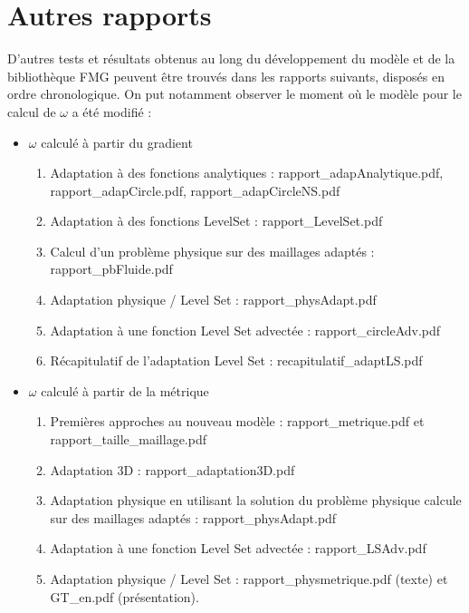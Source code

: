 \section{Autres rapports}
\label{sec:autres}

\indent D'autres tests et résultats obtenus au long du développement du modèle et de la bibliothèque FMG peuvent être trouvés dans les rapports suivants, disposés en ordre chronologique. On put notamment observer le moment où le modèle pour le calcul de \(\omega\) a été modifié : 

\begin{itemize}
    \item \(\omega\) calculé à partir du gradient
	\begin{enumerate}
		\item Adaptation à des fonctions analytiques : rapport\_adapAnalytique.pdf, rapport\_adapCircle.pdf, rapport\_adapCircleNS.pdf
		\item Adaptation à des fonctions LevelSet : rapport\_LevelSet.pdf
		\item Calcul d'un problème physique sur des maillages adaptés : rapport\_pbFluide.pdf
		\item Adaptation physique / Level Set : rapport\_physAdapt.pdf
		\item Adaptation à une fonction Level Set advectée : rapport\_circleAdv.pdf
		\item Récapitulatif de l'adaptation Level Set : recapitulatif\_adaptLS.pdf
	\end{enumerate}
	\item \(\omega\) calculé à partir de la métrique
	\begin{enumerate}
		\item Premières approches au nouveau modèle : rapport\_metrique.pdf et rapport\_taille\_maillage.pdf
		\item Adaptation 3D : rapport\_adaptation3D.pdf
		\item Adaptation physique en utilisant la solution du problème physique calcule sur des maillages adaptés : rapport\_physAdapt.pdf
		\item Adaptation à une fonction Level Set advectée : rapport\_LSAdv.pdf
		\item Adaptation physique / Level Set : rapport\_physmetrique.pdf (texte) et GT\_en.pdf (présentation).
	\end{enumerate}	
\end{itemize}